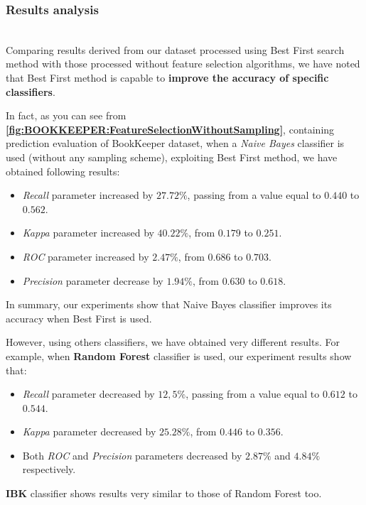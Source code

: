 \documentclass[sigconf]{acmart}
\begin{document}
\subsubsection{Results analysis}
\hfill\\
Comparing results derived from our dataset processed using Best First search method with those processed without feature selection algorithms, we have noted that Best First method is capable to \textbf{improve the accuracy of specific classifiers}.
 
In fact, as you can see from \textbf{\cref{fig:BOOKKEEPER:FeatureSelectionWithoutSampling}}, containing prediction evaluation of BookKeeper dataset, when a \textit{Naive Bayes} classifier is used (without any sampling scheme), exploiting Best First method, we have obtained following results:

\begin{itemize}
\item \textit{Recall} parameter increased by $27.72\%$, passing from a value equal to $0.440$ to $0.562$. 
\item \textit{Kappa} parameter increased by $40.22\%$, from $0.179$ to $0.251$. 
\item \textit{ROC} parameter increased by $2.47\%$, from $0.686$ to $0.703$.
\item \textit{Precision} parameter decrease by $1.94\%$, from $0.630$ to $0.618$.
\end{itemize}
 
In summary, our experiments show that Naive Bayes classifier improves its accuracy when Best First is used. 

However, using others classifiers, we have obtained very different results. For example, when \textbf{Random Forest} classifier is used, our experiment results show that: 

\begin{itemize}
\item \textit{Recall} parameter decreased by $12,5\%$, passing from a value equal to $0.612$ to $0.544$. 
\item \textit{Kappa} parameter decreased by $25.28\%$, from $0.446$ to $0.356$. 
\item Both \textit{ROC} and \textit{Precision} parameters decreased by $2.87\%$ and $4.84\%$ respectively.
\end{itemize}

\textbf{IBK} classifier shows results very similar to those of Random Forest too.
\end{document}

